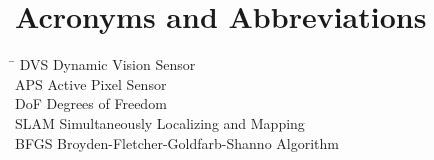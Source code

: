 \section*{Acronyms and Abbreviations}
\begin{tabbing}
  \hspace*{1.6cm}  \= \kill
  DVS \> Dynamic Vision Sensor\\[0.5ex]
  APS \> Active Pixel Sensor \\[0.5ex]
  DoF \> Degrees of Freedom \\[0.5ex]
  SLAM \> Simultaneously Localizing and Mapping \\[0.5ex]
  BFGS \> Broyden-Fletcher-Goldfarb-Shanno Algorithm \\[0.5ex]
\end{tabbing}
